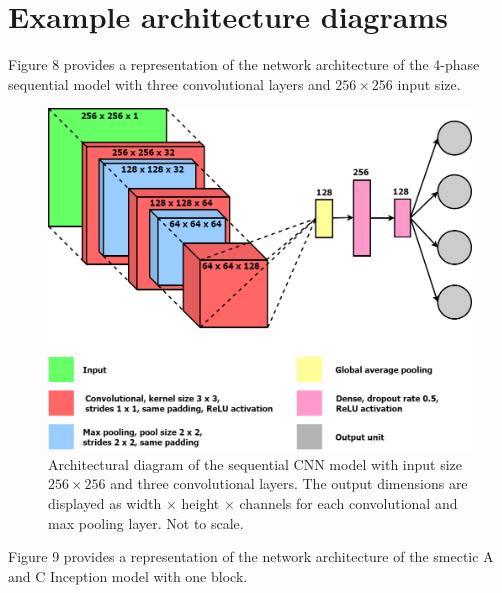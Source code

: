 \documentclass[12pt]{article}
\begin{document}
\section{Example architecture diagrams}
Figure 8 provides a representation of the network architecture of the 4-phase sequential model with three convolutional layers and $256 \times 256$ input size.
\begin{figure}[!htb]
\centering
\includegraphics[width=5.5812in]{images/v3_conv_3_diagram.png}
\caption{Architectural diagram of the sequential CNN model with input size $256 \times 256$ and three convolutional layers. The output dimensions are displayed as width $\times$ height $\times$ channels for each convolutional and max pooling layer. Not to scale.}
\end{figure}
Figure 9 provides a representation of the network architecture of the smectic A and C Inception model with one block.
\end{document}
